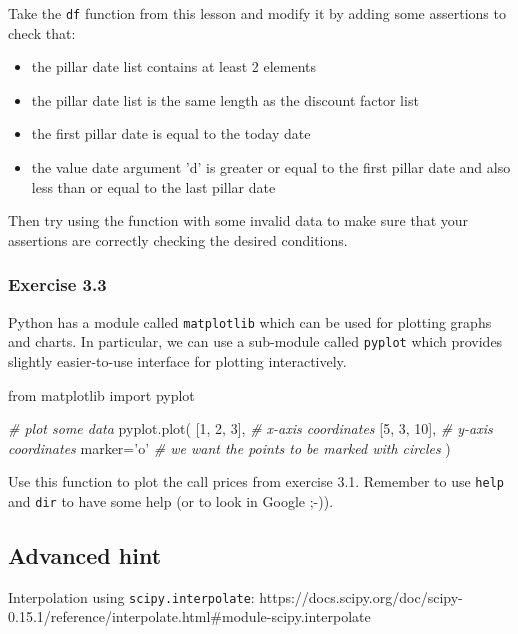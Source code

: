 \documentclass[11pt]{article}
\newenvironment{Shaded}{}{}
\newcommand{\DecValTok}[1]{\textcolor[rgb]{0.25,0.63,0.44}{{#1}}}
\newcommand{\StringTok}[1]{\textcolor[rgb]{0.25,0.44,0.63}{{#1}}}
\newcommand{\CommentTok}[1]{\textcolor[rgb]{0.38,0.63,0.69}{\textit{{#1}}}}
\newcommand{\NormalTok}[1]{{#1}}
\newcommand{\ImportTok}[1]{{#1}}
\newcommand{\OperatorTok}[1]{\textcolor[rgb]{0.40,0.40,0.40}{{#1}}}
\begin{document}
Take the \texttt{df} function from this lesson and modify it by adding some
assertions to check that:
\begin{itemize}
\item the pillar date list contains at least 2 elements
\item the pillar date list is the same length as the discount factor list
\item the first pillar date is equal to the today date
\item the value date argument 'd' is greater or equal to the first pillar date and also less than or equal to the last pillar date
\end{itemize}

Then try using the function with some invalid data to make sure that
your assertions are correctly checking the desired conditions.

\hypertarget{exercise-3.3}{%
\subsubsection{Exercise 3.3}\label{exercise-3.3}}

Python has a module called \texttt{matplotlib} which can be used for
plotting graphs and charts. In particular, we can use a sub-module
called \texttt{pyplot} which provides slightly easier-to-use interface
for plotting interactively.

\begin{Shaded}
\begin{Highlighting}[]
\ImportTok{from}\NormalTok{ matplotlib }\ImportTok{import}\NormalTok{ pyplot}

\CommentTok{# plot some data}
\NormalTok{pyplot.plot(}
\NormalTok{    [}\DecValTok{1}\NormalTok{, }\DecValTok{2}\NormalTok{, }\DecValTok{3}\NormalTok{],   }\CommentTok{# x-axis coordinates}
\NormalTok{    [}\DecValTok{5}\NormalTok{, }\DecValTok{3}\NormalTok{, }\DecValTok{10}\NormalTok{],  }\CommentTok{# y-axis coordinates}
\NormalTok{    marker}\OperatorTok{=}\StringTok{'o'}   \CommentTok{# we want the points to be marked with circles}
\NormalTok{)}
\end{Highlighting}
\end{Shaded}

Use this function to plot the call prices from exercise 3.1. Remember to
use \texttt{help} and \texttt{dir} to have some help (or to look in
Google ;-)).

    \hypertarget{advanced-hint}{%
\subsection{Advanced hint}\label{advanced-hint}}

Interpolation using \texttt{scipy.interpolate}:
https://docs.scipy.org/doc/scipy-0.15.1/reference/interpolate.html\#module-scipy.interpolate


    
    
    
    
\end{document}
